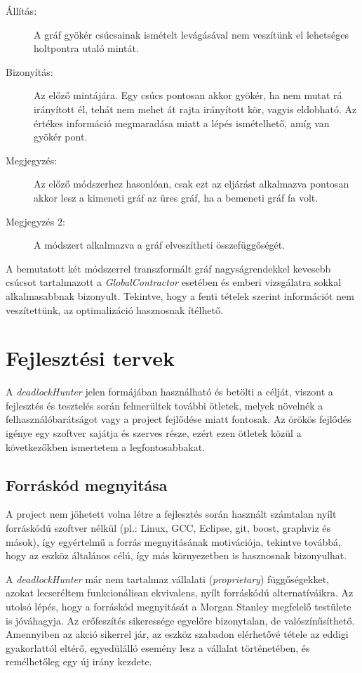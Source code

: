     \begin{description}
        \item[Állítás:] A gráf gyökér csúcsainak ismételt levágásával nem veszítünk el lehetséges holtpontra utaló mintát.
        \item[Bizonyítás:] Az előző mintájára. Egy csúcs pontosan akkor gyökér, ha nem mutat rá irányított él, tehát nem mehet át rajta irányított kör, vagyis eldobható. Az értékes információ megmaradása miatt a lépés ismételhető, amíg van gyökér pont.
        \item[Megjegyzés:] Az előző módszerhez hasonlóan, csak ezt az eljárást alkalmazva pontosan akkor lesz a kimeneti gráf az üres gráf, ha a bemeneti gráf fa volt.
        \item[Megjegyzés 2:] A módszert alkalmazva a gráf elveszítheti összefüggőségét.
    \end{description}
%    
    A bemutatott két módszerrel transzformált gráf nagyságrendekkel kevesebb csúcsot tartalmazott a \emph{GlobalContractor} esetében és emberi vizsgálatra sokkal alkalmasabbnak bizonyult. Tekintve, hogy a fenti tételek szerint információt nem veszítettünk, az optimalizáció hasznosnak ítélhető.
    
    \section{Fejlesztési tervek}
    A \emph{deadlockHunter} jelen formájában használható és betölti a célját, viszont a fejlesztés és tesztelés során felmerültek további ötletek, melyek növelnék a felhasználóbarátságot vagy a project fejlődése miatt fontosak. Az örökös fejlődés igénye egy szoftver sajátja és szerves része, ezért ezen ötletek közül a következőkben ismertetem a legfontosabbakat.
    
    \subsection{Forráskód megnyitása}
    A project nem jöhetett volna létre a fejlesztés során használt számtalan nyílt forráskódú szoftver nélkül (pl.: Linux, GCC, Eclipse, git, boost, graphviz és mások), így egyértelmű a forrás megnyitásának motivációja, tekintve továbbá, hogy az eszköz általános célú, így más környezetben is hasznosnak bizonyulhat.
    
    A \emph{deadlockHunter} már nem tartalmaz vállalati (\emph{proprietary}) függőségekket, azokat lecseréltem funkcionálisan ekvivalens, nyílt forráskódú alternatíváikra. Az utolsó lépés, hogy a forráskód megnyitását a Morgan Stanley megfelelő testülete is jóváhagyja. Az erőfeszítés sikeressége egyelőre bizonytalan, de valószínűsíthető. Amennyiben az akció sikerrel jár, az eszköz szabadon elérhetővé tétele az eddigi gyakorlattól eltérő, egyedülálló esemény lesz a vállalat történetében, és remélhetőleg egy új irány kezdete.
    
